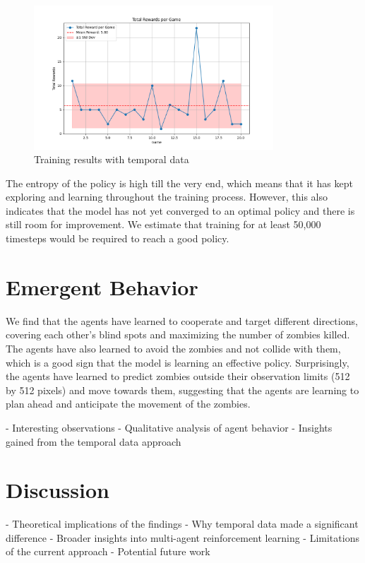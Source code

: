 \documentclass{article}
\begin{document}
\begin{figure}[h]
  \centering
  \includegraphics[width=0.8\textwidth]{rewards2.png}
  \caption{Training results with temporal data}
  \label{fig:training_results_with_temporal}
\end{figure}

The entropy of the policy is high till the very end, which means that it has kept exploring and learning throughout the training process. 
However, this also indicates that the model has not yet converged to an optimal policy and there is still room for improvement. We estimate that 
training for at least 50,000 timesteps would be required to reach a good policy. 



\section{Emergent Behavior}
We find that the agents have learned to cooperate and target different directions, covering each other's blind spots and maximizing the number of zombies killed.
The agents have also learned to avoid the zombies and not collide with them, which is a good sign that the model is learning an effective policy.
Surprisingly, the agents have learned to predict zombies outside their observation limits (512 by 512 pixels) and move towards them, suggesting that the agents are learning to plan ahead and anticipate the movement of the zombies.


- Interesting observations
- Qualitative analysis of agent behavior
- Insights gained from the temporal data approach

\section{Discussion}
- Theoretical implications of the findings
- Why temporal data made a significant difference
- Broader insights into multi-agent reinforcement learning
- Limitations of the current approach
- Potential future work
\end{document}
